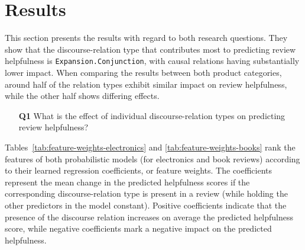 \documentclass[
    a4paper,%
    12pt,%
    oneside,%
    toc=bibliography,
    final,
]{scrartcl}
\begin{document}
\section{Results}
\label{sec:results}

\begin{sloppypar}
This section presents the results with regard to both research questions. They show that the discourse-relation type that contributes most to predicting review helpfulness is \lstinline|Expansion.Conjunction|, with causal relations having substantially lower impact. When comparing the results between both product categories, around half of the relation types exhibit similar impact on review helpfulness, while the other half shows differing effects.
\end{sloppypar}

\begin{enumerate}[rightmargin=1cm]
\item[\textbf{Q1}] What is the effect of individual discourse-relation types on predicting review helpfulness?
\end{enumerate}

Tables~\ref{tab:feature-weights-electronics} and \ref{tab:feature-weights-books} rank the features of both probabilistic models (for electronics and book reviews) according to their learned regression coefficients, or feature weights.
The coefficients represent the mean change in the predicted helpfulness scores if the corresponding discourse-relation type is present in a review (while holding the other predictors in the model constant). Positive coefficients indicate that the presence of the discourse relation increases on average the predicted helpfulness score, while negative coefficients mark a negative impact on the predicted helpfulness.
\end{document}
